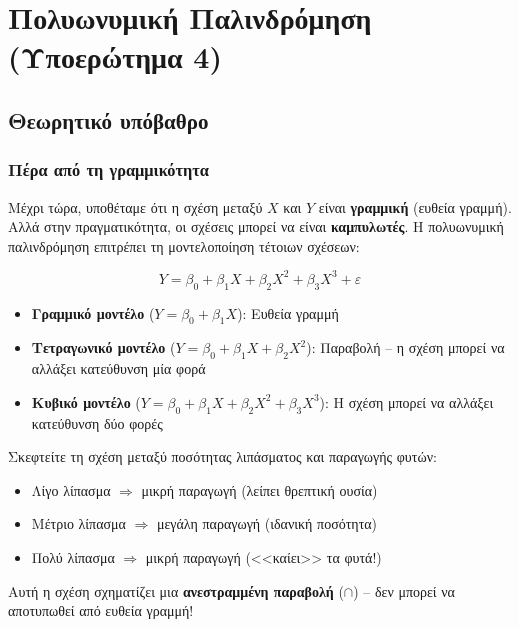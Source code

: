 \documentclass[12pt,a4paper]{article}
\begin{document}
\newpage
\section{Πολυωνυμική Παλινδρόμηση (Υποερώτημα 4)}

\subsection{Θεωρητικό υπόβαθρο}

\subsubsection{Πέρα από τη γραμμικότητα}

\begin{theorybox}
Μέχρι τώρα, υποθέταμε ότι η σχέση μεταξύ $X$ και $Y$ είναι \textbf{γραμμική} (ευθεία γραμμή). Αλλά στην πραγματικότητα, οι σχέσεις μπορεί να είναι \textbf{καμπυλωτές}. Η πολυωνυμική παλινδρόμηση επιτρέπει τη μοντελοποίηση τέτοιων σχέσεων:

\begin{equation}
Y = \beta_0 + \beta_1 X + \beta_2 X^2 + \beta_3 X^3 + \varepsilon
\end{equation}

\begin{itemize}
    \item \textbf{Γραμμικό μοντέλο} ($Y = \beta_0 + \beta_1 X$): Ευθεία γραμμή
    \item \textbf{Τετραγωνικό μοντέλο} ($Y = \beta_0 + \beta_1 X + \beta_2 X^2$): Παραβολή -- η σχέση μπορεί να αλλάξει κατεύθυνση μία φορά
    \item \textbf{Κυβικό μοντέλο} ($Y = \beta_0 + \beta_1 X + \beta_2 X^2 + \beta_3 X^3$): Η σχέση μπορεί να αλλάξει κατεύθυνση δύο φορές
\end{itemize}
\end{theorybox}

\begin{examplebox}
Σκεφτείτε τη σχέση μεταξύ ποσότητας λιπάσματος και παραγωγής φυτών:
\begin{itemize}
    \item Λίγο λίπασμα $\Rightarrow$ μικρή παραγωγή (λείπει θρεπτική ουσία)
    \item Μέτριο λίπασμα $\Rightarrow$ μεγάλη παραγωγή (ιδανική ποσότητα)
    \item Πολύ λίπασμα $\Rightarrow$ μικρή παραγωγή (<<καίει>> τα φυτά!)
\end{itemize}
Αυτή η σχέση σχηματίζει μια \textbf{ανεστραμμένη παραβολή} ($\cap$) -- δεν μπορεί να αποτυπωθεί από ευθεία γραμμή!
\end{examplebox}
\end{document}
